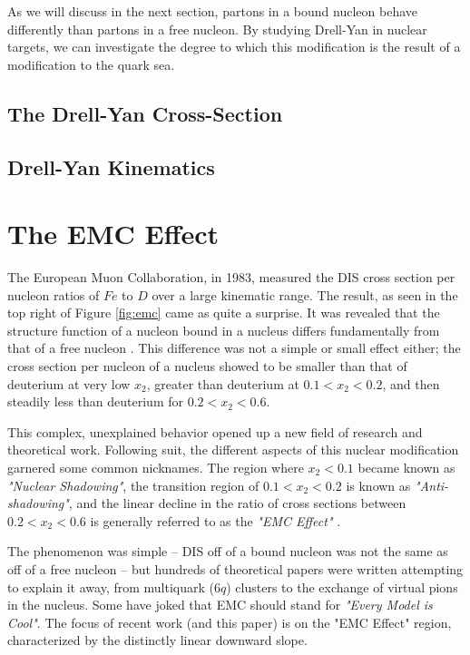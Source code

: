 As we will discuss in the next section, partons in a bound nucleon behave differently than partons in a free nucleon. By studying Drell-Yan in nuclear targets, we can investigate the degree to which this modification is the result of a modification to the quark sea.

\subsection{The Drell-Yan Cross-Section}

\subsection{Drell-Yan Kinematics}

\section{The EMC Effect}

The European Muon Collaboration, in 1983, measured the DIS cross section per nucleon ratios of $Fe$ to $D$ over a large kinematic range.  The result, as seen in the top right of Figure \ref{fig:emc} came as quite a surprise.  It was revealed that the structure function of a nucleon bound in a nucleus differs fundamentally from that of a free nucleon  \cite{Aubert:1983xm}.  This difference was not a simple or small effect either; the cross section per nucleon of a nucleus showed to be smaller than that of deuterium at very low $x_2$, greater than deuterium at $0.1<x_2<0.2$, and then steadily less than deuterium for $0.2<x_2<0.6$. 

This complex, unexplained behavior opened up a new field of research and theoretical work. Following suit, the different aspects of this nuclear modification garnered some common nicknames.  The region where $x_2<0.1$ became known as \emph{"Nuclear Shadowing"}, the transition region of $0.1<x_2<0.2$ is known as \emph{"Anti-shadowing"}, and the linear decline in the ratio of cross sections between $0.2<x_2<0.6$ is generally referred to as the \emph{"EMC Effect"} \cite{Geesaman:1995yd}.

The phenomenon was simple -- DIS off of a bound nucleon was not the same as off of a free nucleon -- but hundreds of theoretical papers were written attempting to explain it away, from multiquark ($6q$) clusters to the exchange of virtual pions in the nucleus. Some have joked that EMC should stand for \emph{"Every Model is Cool"}. The focus of recent work (and this paper) is on the "EMC Effect" region, characterized by the distinctly linear downward slope.

